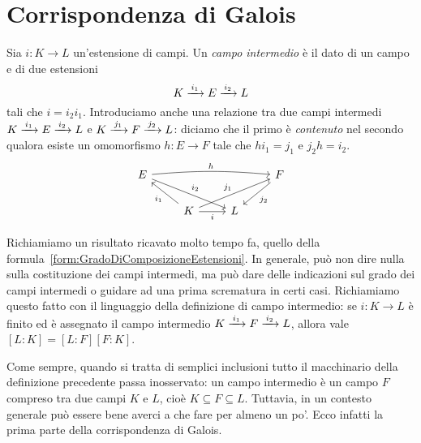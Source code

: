 
\section{Corrispondenza di Galois}

\begin{defi}
Sia \(i : K \to L\) un'estensione di campi. Un {\em campo intermedio} è il dato di un campo e di due estensioni 
\[K \xrightarrow{\,i_1\,} E \xrightarrow{\,i_2\,} L\]
tali che \(i = i_2 i_1\). Introduciamo anche una relazione tra due campi intermedi \(K \xrightarrow{\,i_1\,} E \xrightarrow{\,i_2\,} L\) e \(K \xrightarrow{\,j_1\,} F \xrightarrow{\,j_2\,} L\): diciamo che il primo è {\em contenuto} nel secondo qualora esiste un omomorfismo \(h : E \to F\) tale che \(h i_1 = j_1\) e \(j_2 h = i_2\).
\begin{equation}\begin{tikzcd}
E \ar["{i_2}", drr] \ar["h", rrr, bend left=5] & & & F \ar["{j_2}", dl] \\
 & K \ar["i", r, swap] \ar["{i_1}", ul] \ar["{j_1}", urr] & L
\end{tikzcd}\label{diag:MorfismoCampiIntermedi}
\end{equation}
\end{defi}

Richiamiamo un risultato ricavato molto tempo fa, quello della formula~\eqref{form:GradoDiComposizioneEstensioni}. In generale, può non dire nulla sulla costituzione dei campi intermedi, ma può dare delle indicazioni sul grado dei campi intermedi o guidare ad una prima scrematura in certi casi. Richiamiamo questo fatto con il linguaggio della definizione di campo intermedio: se \(i : K \to L\) è finito ed è assegnato il campo intermedio \(K \xrightarrow{\,i_1\,} F \xrightarrow{\,i_2\,} L\), allora vale \([L:K] = [L:F][F:K]\).

Come sempre, quando si tratta di semplici inclusioni tutto il macchinario della definizione precedente passa inosservato: un campo intermedio è un campo \(F\) compreso tra due campi \(K\) e \(L\), cioè \(K \subseteq F \subseteq L\). Tuttavia, in un contesto generale può essere bene averci a che fare per almeno un po'. Ecco infatti la prima parte della corrispondenza di Galois.


